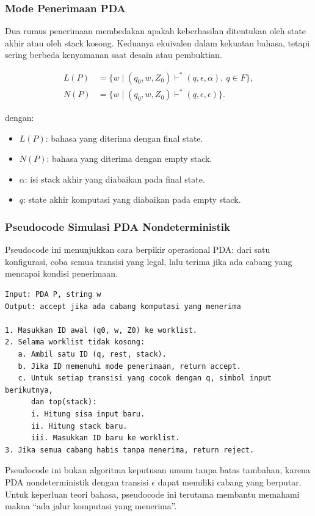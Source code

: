 \subsubsection{Mode Penerimaan PDA}

\begin{jawab}
Dua rumus penerimaan membedakan apakah keberhasilan ditentukan oleh state akhir atau oleh stack kosong. Keduanya ekuivalen dalam kekuatan bahasa, tetapi sering berbeda kenyamanan saat desain atau pembuktian.
\end{jawab}

\begin{align}
    L(P) &= \{w \mid (q_0,w,Z_0)\vdash^*(q,\epsilon,\alpha),\ q\in F\}, \label{eq:final-state-pda}\\
    N(P) &= \{w \mid (q_0,w,Z_0)\vdash^*(q,\epsilon,\epsilon)\}. \label{eq:empty-stack-pda}
\end{align}

dengan:
\begin{itemize}
    \item $L(P)$: bahasa yang diterima dengan final state.
    \item $N(P)$: bahasa yang diterima dengan empty stack.
    \item $\alpha$: isi stack akhir yang diabaikan pada final state.
    \item $q$: state akhir komputasi yang diabaikan pada empty stack.
\end{itemize}

\subsubsection{Pseudocode Simulasi PDA Nondeterministik}

\begin{jawab}
Pseudocode ini menunjukkan cara berpikir operasional PDA: dari satu konfigurasi, coba semua transisi yang legal, lalu terima jika ada cabang yang mencapai kondisi penerimaan.
\end{jawab}

\begin{lstlisting}[caption={Pseudocode simulasi PDA nondeterministik}, label={lst:simulasi-pda}]
Input: PDA P, string w
Output: accept jika ada cabang komputasi yang menerima

1. Masukkan ID awal (q0, w, Z0) ke worklist.
2. Selama worklist tidak kosong:
   a. Ambil satu ID (q, rest, stack).
   b. Jika ID memenuhi mode penerimaan, return accept.
   c. Untuk setiap transisi yang cocok dengan q, simbol input berikutnya,
      dan top(stack):
      i. Hitung sisa input baru.
      ii. Hitung stack baru.
      iii. Masukkan ID baru ke worklist.
3. Jika semua cabang habis tanpa menerima, return reject.
\end{lstlisting}

Pseudocode ini bukan algoritma keputusan umum tanpa batas tambahan, karena PDA nondeterministik dengan transisi $\epsilon$ dapat memiliki cabang yang berputar. Untuk keperluan teori bahasa, pseudocode ini terutama membantu memahami makna ``ada jalur komputasi yang menerima''.
